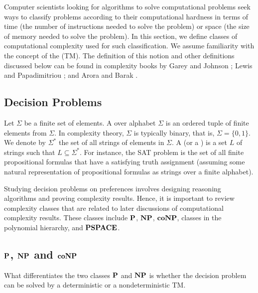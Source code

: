 Computer scientists looking for algorithms to solve computational problems
seek ways to classify problems according to their computational hardness
in terms of time (the number of instructions needed to solve the problem) 
or space (the size of memory needed to solve the problem).
In this section, we define classes of computational
complexity used for such classification.
We assume familiarity with the concept of the  (TM).
The definition of this notion and other definitions discussed 
below can be found in complexity
books by Garey and Johnson \cite{gar-joh:b:int}; Lewis and Papadimitriou
\cite{Lewis:Comput}; and Arora and Barak \cite{Arora:Comput}.



\subsection{Decision Problems}
Let $\Sigma$ be a finite set of elements. A  over alphabet $\Sigma$
is an ordered tuple of finite elements from $\Sigma$. In complexity theory,
$\Sigma$ is typically binary, that is, $\Sigma=\{0,1\}$.
We denote by $\Sigma^*$ the set of all strings of elements in $\Sigma$.
A  (or a ) is a set 
$L$ of strings such that $L \subseteq \Sigma^*$.
For instance, the SAT problem is the set of all finite propositional
formulas that have a satisfying truth assignment (assuming some natural
representation of propositional formulas as strings over a finite alphabet).


Studying decision problems on preferences involves designing 
reasoning algorithms and proving complexity results.  
Hence, it is important to review complexity classes
that are related to later discussions of computational complexity results.
These classes include $\textbf{P}$, $\textbf{NP}$, $\textbf{coNP}$, classes in the polynomial
hierarchy, and $\textbf{PSPACE}$.


\subsection{$\textbf{P}$, $\textbf{NP}$ and $\textbf{coNP}$}
What differentiates the two classes $\textbf{P}$ and $\textbf{NP}$ is whether the decision problem
can be solved by a deterministic or a nondeterministic TM. \cite{Arora:Comput}

